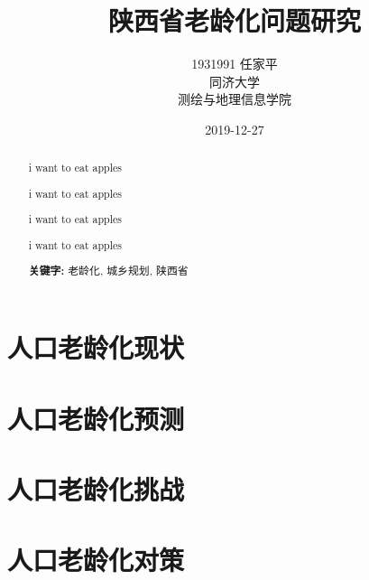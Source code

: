 \documentclass[a4paper, 12pt, UTF8]{article}
\begin{document}
\title{\Huge 陕西省老龄化问题研究}
\author{\Large 
        1931991 任家平 \\[12pt]
        同济大学 \\[12pt]
        测绘与地理信息学院}
\date{2019-12-27}
\maketitle
\thispagestyle{empty}

\newpage
\renewcommand\abstractname{\Large\textbf{摘要}}
\begin{abstract}
\large
    
    i want to eat apples

    i want to eat apples

    i want to eat apples

    i want to eat apples


    \par\textbf{关键字:} 老龄化, 城乡规划, 陕西省
\end{abstract}
\thispagestyle{empty}

\newpage
{}
\tableofcontents

\newpage
{}
\section{人口老龄化现状}

\section{人口老龄化预测}

\section{人口老龄化挑战}

\section{人口老龄化对策}
\end{document}
